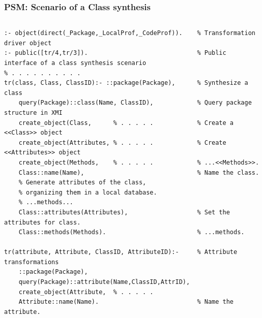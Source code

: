 \documentclass[10pt]{beamer}
\begin{document}
\begin{frame}[fragile]
  \frametitle{PSM: Scenario of a Class synthesis}

  \begin{columns}
    \begin{column}{0.6\textwidth}
\begin{verbatim}
:- object(direct(_Package,_LocalProf,_CodeProf)).    % Transformation driver object
:- public([tr/4,tr/3]).                              % Public interface of a class synthesis scenario
% . . . . . . . . . .
tr(class, Class, ClassID):- ::package(Package),      % Synthesize a class
    query(Package)::class(Name, ClassID),            % Query package structure in XMI
    create_object(Class,      % . . . . .            % Create a <<Class>> object
    create_object(Attributes, % . . . . .            % Create <<Attributes>> object
    create_object(Methods,    % . . . . .            % ...<<Methods>>.
    Class::name(Name),                               % Name the class.
    % Generate attributes of the class,
    % organizing them in a local database.
    % ...methods...
    Class::attributes(Attributes),                   % Set the attributes for class.
    Class::methods(Methods).                         % ...methods.

tr(attribute, Attribute, ClassID, AttributeID):-     % Attribute transformations
    ::package(Package),
    query(Package)::attribute(Name,ClassID,AttrID),
    create_object(Attribute,  % . . . . .
    Attribute::name(Name).                           % Name the attribute.


\end{verbatim}
\end{column}
\end{columns}
\end{frame}
\end{document}

